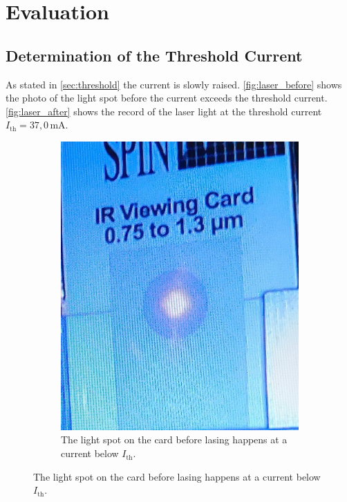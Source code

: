 \newpage
\section{Evaluation}
\label{sec:evaluation}
\subsection{Determination of the Threshold Current}
As stated in \ref{sec:threshold} the current is slowly raised.
\autoref{fig:laser_before} shows the photo of the light spot before the current exceeds the threshold current.
\autoref{fig:laser_after} shows the record of the laser light at the threshold current $I_\text{th} = 37,0 \,$mA.
\begin{figure}[ht]
    \centering
    \begin{subfigure}{0.49\textwidth}
        \includegraphics[width=\textwidth]{bilder/laser_before.jpg}
        \caption{The light spot on the card before lasing happens at a current below $I_\text{th}$. \cite{anleitungHeNe}}
        \label{fig:laser_before}
    \end{subfigure}

\end{figure}
